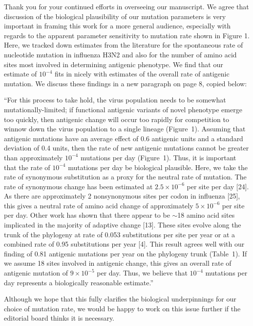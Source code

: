 \documentclass[stdletter,a4paper,noaddrfrom,orderfromdateto,11pt]{newlfm}
\begin{document}
\begin{newlfm}

Thank you for your continued efforts in overseeing our manuscript.  We agree that discussion of the biological plausibility of our mutation parameters is very important in framing this work for a more general audience, especially with regards to the apparent parameter sensitivity to mutation rate shown in Figure 1.  Here, we tracked down estimates from the literature for the spontaneous rate of nucleotide mutation in influenza H3N2 and also for the number of amino acid sites most involved in determining antigenic phenotype.  We find that our estimate of $10^{-4}$ fits in nicely with estimates of the overall rate of antigenic mutation.  We discuss these findings in a new paragraph on page 8, copied below:

``For this process to take hold, the virus population needs to be somewhat mutationally-limited; if functional antigenic variants of novel phenotype emerge too quickly, then antigenic change will occur too rapidly for competition to winnow down the virus population to a single lineage (Figure~1).  Assuming that antigenic mutations have an average effect of 0.6 antigenic units and a standard deviation of 0.4 units, then the rate of new antigenic mutations cannot be greater than approximately $10^{-4}$ mutations per day (Figure~1).  Thus, it is important that the rate of $10^{-4}$ mutations per day be biological plausible.  Here, we take the rate of synonymous substitution as a proxy for the neutral rate of mutation.  The rate of synonymous change has been estimated at $2.5 \times 10^{-6}$ per site per day [24].  As there are approximately 2 nonsynonymous sites per codon in influenza [25], this gives a neutral rate of amino acid change of approximately $5 \times 10^{-6}$ per site per day.  Other work has shown that there appear to be $\sim$18 amino acid sites implicated in the majority of adaptive change [13].  These sites evolve along the trunk of the phylogeny at rate of 0.053 substitutions per site per year or at a combined rate of 0.95 substitutions per year [4].  This result agrees well with our finding of 0.81 antigenic mutations per year on the phylogeny trunk (Table~1).  If we assume 18 sites involved in antigenic change, this gives an overall rate of antigenic mutation of $9 \times 10^{-5}$ per day.  Thus, we believe that $10^{-4}$ mutations per day represents a biologically reasonable estimate.''

Although we hope that this fully clarifies the biological underpinnings for our choice of mutation rate, we would be happy to work on this issue further if the editorial board thinks it is necessary.

\end{newlfm}
\end{document}
